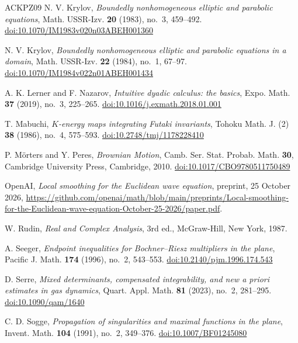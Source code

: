 \begin{thebibliography}{ACKPZ09}
 N. V. Krylov, \emph{Boundedly nonhomogeneous elliptic and parabolic equations}, Math. USSR-Izv. \textbf{20} (1983), no.~3, 459--492. \href{https://doi.org/10.1070/IM1983v020n03ABEH001360}{doi:10.1070/IM1983v020n03ABEH001360}

 N. V. Krylov, \emph{Boundedly nonhomogeneous elliptic and parabolic equations in a domain}, Math. USSR-Izv. \textbf{22} (1984), no.~1, 67--97. \href{https://doi.org/10.1070/IM1984v022n01ABEH001434}{doi:10.1070/IM1984v022n01ABEH001434}

 A. K. Lerner and F. Nazarov, \emph{Intuitive dyadic calculus: the basics}, Expo. Math. \textbf{37} (2019), no.~3, 225--265. \href{https://doi.org/10.1016/j.exmath.2018.01.001}{doi:10.1016/j.exmath.2018.01.001}

 T. Mabuchi, \emph{$K$-energy maps integrating Futaki invariants}, Tohoku Math. J. (2) \textbf{38} (1986), no.~4, 575--593. \href{https://doi.org/10.2748/tmj/1178228410}{doi:10.2748/tmj/1178228410}

 P. M\"orters and Y. Peres, \emph{Brownian Motion}, Camb. Ser. Stat. Probab. Math. \textbf{30}, Cambridge University Press, Cambridge, 2010. \href{https://doi.org/10.1017/CBO9780511750489}{doi:10.1017/CBO9780511750489}

 OpenAI, \emph{Local smoothing for the Euclidean wave equation}, preprint, 25 October 2026, \url{https://github.com/openai/math/blob/main/preprints/Local-smoothing-for-the-Euclidean-wave-equation-October-25-2026/paper.pdf}.

 W. Rudin, \emph{Real and Complex Analysis}, 3rd ed., McGraw-Hill, New York, 1987.

 A. Seeger, \emph{Endpoint inequalities for Bochner--Riesz multipliers in the plane}, Pacific J. Math. \textbf{174} (1996), no.~2, 543--553. \href{https://doi.org/10.2140/pjm.1996.174.543}{doi:10.2140/pjm.1996.174.543}

 D. Serre, \emph{Mixed determinants, compensated integrability, and new a priori estimates in gas dynamics}, Quart. Appl. Math. \textbf{81} (2023), no.~2, 281--295. \href{https://doi.org/10.1090/qam/1640}{doi:10.1090/qam/1640}

 C. D. Sogge, \emph{Propagation of singularities and maximal functions in the plane}, Invent. Math. \textbf{104} (1991), no.~2, 349--376. \href{https://doi.org/10.1007/BF01245080}{doi:10.1007/BF01245080}


\end{thebibliography}
